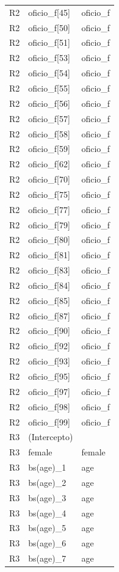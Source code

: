 \begin{longtable}{lll}
R2 & oficio\_f[45] & oficio\_f \\
R2 & oficio\_f[50] & oficio\_f \\
R2 & oficio\_f[51] & oficio\_f \\
R2 & oficio\_f[53] & oficio\_f \\
R2 & oficio\_f[54] & oficio\_f \\
R2 & oficio\_f[55] & oficio\_f \\
R2 & oficio\_f[56] & oficio\_f \\
R2 & oficio\_f[57] & oficio\_f \\
R2 & oficio\_f[58] & oficio\_f \\
R2 & oficio\_f[59] & oficio\_f \\
R2 & oficio\_f[62] & oficio\_f \\
R2 & oficio\_f[70] & oficio\_f \\
R2 & oficio\_f[75] & oficio\_f \\
R2 & oficio\_f[77] & oficio\_f \\
R2 & oficio\_f[79] & oficio\_f \\
R2 & oficio\_f[80] & oficio\_f \\
R2 & oficio\_f[81] & oficio\_f \\
R2 & oficio\_f[83] & oficio\_f \\
R2 & oficio\_f[84] & oficio\_f \\
R2 & oficio\_f[85] & oficio\_f \\
R2 & oficio\_f[87] & oficio\_f \\
R2 & oficio\_f[90] & oficio\_f \\
R2 & oficio\_f[92] & oficio\_f \\
R2 & oficio\_f[93] & oficio\_f \\
R2 & oficio\_f[95] & oficio\_f \\
R2 & oficio\_f[97] & oficio\_f \\
R2 & oficio\_f[98] & oficio\_f \\
R2 & oficio\_f[99] & oficio\_f \\
R3 & (Intercepto) &  \\
R3 & female & female \\
R3 & bs(age)\_1 & age \\
R3 & bs(age)\_2 & age \\
R3 & bs(age)\_3 & age \\
R3 & bs(age)\_4 & age \\
R3 & bs(age)\_5 & age \\
R3 & bs(age)\_6 & age \\
R3 & bs(age)\_7 & age \\

\end{longtable}
